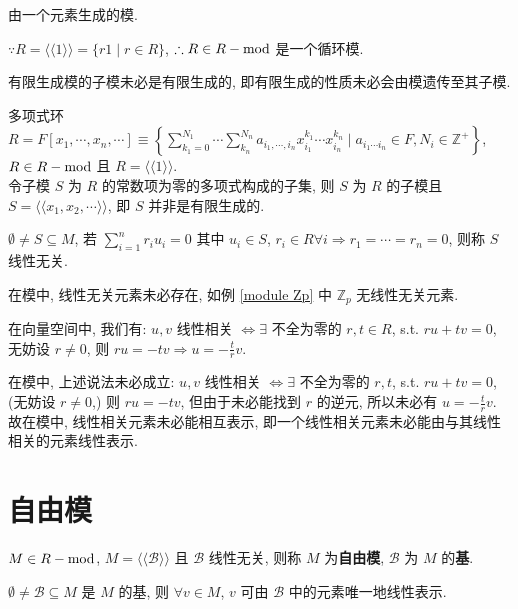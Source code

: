 \documentclass{note}
\begin{document}
\begin{df}[循环模]
    由一个元素生成的模.
\end{df}

\begin{eg}
    $\because R=\langle\langle 1\rangle\rangle=\{r1\mid r\in R\}$, $\therefore R\in R-\operatorname{mod}$ 是一个循环模.
\end{eg}

有限生成模的子模未必是有限生成的, 即有限生成的性质未必会由模遗传至其子模.
\begin{eg}
    多项式环 $R=F[x_1,\cdots,x_n,\cdots]\equiv\left\{\sum_{k_1=0}^{N_1}\cdots\sum_{k_n}^{N_n}a_{i_1,\cdots,i_n}x_{i_1}^{k_1}\cdots x_{i_n}^{k_n}\mid a_{i_1\cdots i_n}\in F,N_i\in\mathbb{Z}^+\right\}$, $R\in R-\operatorname{mod}$ 且 $R=\langle\langle 1\rangle\rangle$.\\
    令子模 $S$ 为 $R$ 的常数项为零的多项式构成的子集, 则 $S$ 为 $R$ 的子模且 $S=\langle\langle x_1,x_2,\cdots\rangle\rangle$, 即 $S$ 并非是有限生成的.
\end{eg}

\begin{df}[线性无关]
    $\emptyset\neq S\subseteq M$, 若 $\sum_{i=1}^nr_iu_i=0$ 其中 $u_i\in S$, $r_i\in R\forall i\Longrightarrow r_1=\cdots=r_n=0$, 则称 $S$ 线性无关.
\end{df}

在模中, 线性无关元素未必存在, 如例 \ref{module Zp} 中 $\mathbb{Z}_p$ 无线性无关元素.

在向量空间中, 我们有: $u,v$ 线性相关 $\Longleftrightarrow\exists$ 不全为零的 $r,t\in R$, s.t. $ru+tv=0$, 无妨设 $r\neq 0$, 则 $ru=-tv\Longrightarrow u=-\frac{t}{r}v$.

在模中, 上述说法未必成立: $u,v$ 线性相关 $\Longleftrightarrow\exists$ 不全为零的 $r,t$, s.t. $ru+tv=0$, (无妨设 $r\neq 0$,) 则 $ru=-tv$, 但由于未必能找到 $r$ 的逆元, 所以未必有 $u=-\frac{t}{r}v$. 故在模中, 线性相关元素未必能相互表示, 即一个线性相关元素未必能由与其线性相关的元素线性表示.

\section{自由模}
\begin{df}[自由模]
    $M\in R-\operatorname{mod}$, $M=\langle\langle\mathcal{B}\rangle\rangle$ 且 $\mathcal{B}$ 线性无关, 则称 $M$ 为\textbf{自由模}, $\mathcal{B}$ 为 $M$ 的\textbf{基}.
\end{df}

\begin{thm}[(课本定理 4.3)]
    $\emptyset\neq\mathcal{B}\subseteq M$ 是 $M$ 的基, 则 $\forall v\in M$, $v$ 可由 $\mathcal{B}$ 中的元素唯一地线性表示.
\end{thm}
\end{document}
